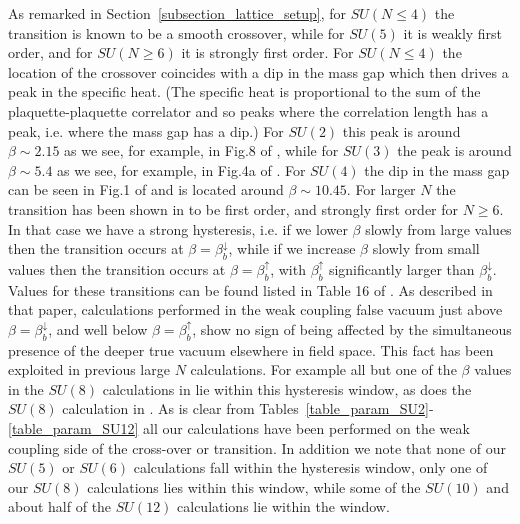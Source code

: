 \documentclass[12pt]{article}
\begin{document}
As remarked in Section~\ref{subsection_lattice_setup}, for $SU(N\leq 4)$ the transition
is known to be a smooth crossover, while for $SU(5)$ it is weakly first order,
and for $SU(N\geq 6)$ it is strongly first order. For $SU(N\leq 4)$ the location
of the crossover coincides with a dip in the mass gap which then drives a peak in the
specific heat. (The specific heat is proportional to the sum of the plaquette-plaquette correlator
and so peaks where the correlation length has a peak, i.e. where the mass gap has a dip.)
For $SU(2)$ this peak is around $\beta\sim 2.15$ as we see, for example, in Fig.8 of
%
\cite{KIGSMT-SU2-1983},
%
while for $SU(3)$ the peak is around $\beta\sim 5.4$ as we see, for example, in Fig.4a of
%
\cite{KIGSMT-SU3-1983}.
%
For $SU(4)$ the dip in the mass gap can be seen in Fig.1 of
%
\cite{BLMT_N}
%
and is located  around $\beta\sim 10.45$. For larger $N$ the transition has been shown in
%
\cite{BLMTUW_Tc}
%
to be first order, and strongly first order for $N\geq 6$.
In that case we have a strong hysteresis, i.e. if we lower $\beta$ slowly from large values 
then the transition occurs at $\beta=\beta_b^{\downarrow}$, while if we increase  $\beta$ slowly
from small values then the transition occurs at $\beta=\beta_b^{\uparrow}$, with 
$\beta_b^{\uparrow}$ significantly larger than $\beta_b^{\downarrow}$.
Values for these transitions can be found listed in Table 16 of 
%
\cite{BLMTUW_Tc}.
%
As described in that paper, calculations performed in the weak coupling false vacuum just
above $\beta=\beta_b^{\downarrow}$, and well below $\beta=\beta_b^{\uparrow}$, show no sign of
being affected by the simultaneous presence of the deeper true vacuum elsewhere
in field space. This fact has been exploited in previous large $N$ calculations.
For example all but one of the $\beta$ values in the $SU(8)$ calculations in
%
\cite{BLMTUW_N}
%
lie within this hysteresis window, as does the $SU(8)$ calculation in
%
\cite{BLARER_N}.
%
As is clear from Tables~\ref{table_param_SU2}-\ref{table_param_SU12}
all our calculations have been performed on the weak coupling side
of the cross-over or transition. In addition we note that
none of our $SU(5)$ or  $SU(6)$
calculations fall within the hysteresis window, only one of our $SU(8)$
calculations lies within this window, while some of the $SU(10)$ and about
half of the $SU(12)$ calculations lie within the window. 
\end{document}
